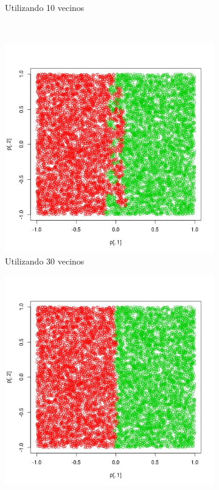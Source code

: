 \documentclass[12pt, a4paper]{article}
\begin{document}
\begin{figure}
\begin{subfigure}[b]{0.45\textwidth}
        \caption{Utilizando 10 vecinos}
    \end{subfigure}
      ~ %
    \begin{subfigure}[b]{0.45\textwidth}
        \includegraphics[width=\textwidth]{predE30}
        \caption{Utilizando 30 vecinos}
    \end{subfigure}
    \begin{subfigure}[b]{0.45\textwidth}
        \includegraphics[width=\textwidth]{predE60}

\end{subfigure}
\end{figure}
\end{document}
